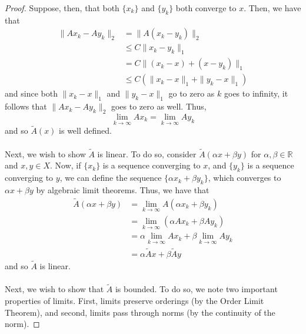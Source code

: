 \documentclass[fontsize=11pt]{scrartcl} %
\numberwithin{equation}{section} %
\numberwithin{figure}{section} %
\numberwithin{table}{section} %
\newcommand{\R}{\mathbb{R}}
\begin{document}
\begin{proof}
    Suppose, then, that both $\{x_k\}$ and $\{y_k\}$ both converge to $x$.
    Then, we have that
    \[
        \begin{aligned}
            \|Ax_k-Ay_k\|_2 &= \|A(x_k-y_k)\|_2\\
                        &\leq C\|x_k-y_k\|_1\\
                        &= C\|(x_k-x) + (x-y_k)\|_1\\
                        &\leq C(\|x_k-x\|_1 + \|y_k-x\|_1)
        \end{aligned}
    \]
    and since both $\|x_k-x\|_1$ and $\|y_k-x\|_1$ go to zero as $k$ goes to
    infinity, it follows that $\|Ax_k -Ay_k\|_2$ goes to zero as well.
    Thus,
    \[
        \lim_{k\to\infty}Ax_k = \lim_{k\to\infty}Ay_k
    \]
    and so $\tilde{A}(x)$ is well defined.
    \\
    \\
    Next, we wish to show $\tilde{A}$ is linear.
    To do so, consider $\tilde{A}(\alpha x + \beta y)$ for $\alpha,\beta\in\R$
    and $x,y\in X$.
    Now, if $\{x_k\}$ is a sequence converging to $x$, and $\{y_k\}$ is a
    sequence converging to $y$, we can define the sequence $\{\alpha x_k + \beta
    y_k\}$, which converges to $\alpha x + \beta y$ by algebraic limit theorems.
    Thus, we have that
    \[
        \begin{aligned}
            \tilde{A}(\alpha x+\beta y) &= \lim_{k\to\infty}A(\alpha x_k +\beta
            y_k)\\
            &=\lim_{k\to\infty}(\alpha Ax_k + \beta Ay_k)\\
            &=\alpha\lim_{k\to\infty}Ax_k + \beta\lim_{k\to\infty}Ay_k\\
            &=\alpha\tilde{A}x + \beta\tilde{A}y
        \end{aligned}
    \]
    and so $\tilde{A}$ is linear.
    \\
    \\
    Next, we wish to show that $\tilde{A}$ is bounded. To do so, we note two
    important properties of limits. First, limits preserve orderings (by the
    Order Limit Theorem), and second, limits pass through norms (by the
    continuity of the norm).
    

\end{proof}
\end{document}
